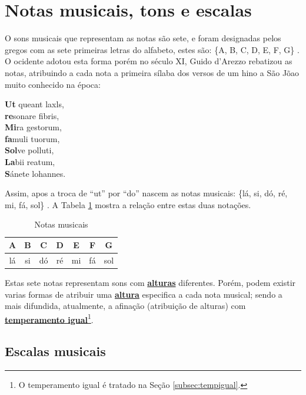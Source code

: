 \section{Notas musicais, tons e escalas}
\label{sec:notasmusicais}

O sons musicais que representam as notas são sete, 
e foram designadas pelos gregos com as sete primeiras letras do alfabeto,
estes são: \{A, B, C, D, E, F, G\} \cite[pp. 11]{grabner2001teoria} \cite[pp. 9]{cardoso1973curso}.
O ocidente adotou esta forma porém no século XI, 
Guido d'Arezzo rebatizou as notas, 
atribuindo a cada nota a primeira sílaba dos versos
de um hino a São Jõao muito conhecido na época:
\begin{citando}%
\textbf{Ut} queant laxls,\\
\textbf{re}sonare fibris,\\
\textbf{Mi}ra gestorum,\\
\textbf{fa}muli tuorum,\\
\textbf{Sol}ve polluti,\\
\textbf{La}bii reatum,\\
\textbf{S}ánete lohannes.
\end{citando}
 Assim, apos a troca de ``ut'' por ``do'' nascem as notas musicais: 
\{lá, si, dó, ré, mi, fá, sol\} \cite[pp. 21]{arbones2012armonia} \cite[pp. 7]{cardoso1973curso}. 
A Tabela \ref{tab:notasmusic} mostra a relação entre estas duas notações.

\begin{table}[h]
\centering
\begin{tabular}{|c|c|c|c|c|c|c|}
\hline
A  & B  & C  & D  & E  & F  & G\\ \hline
lá & si & dó & ré & mi & fá & sol \\ \hline
\end{tabular}
\caption{Notas musicais}
\label{tab:notasmusic}
\end{table}

Estas sete notas representam sons com \hyperref[sec:pos:Altura]{\textbf{alturas}} diferentes.
Porém, podem existir varias formas de atribuir uma \hyperref[sec:pos:Altura]{\textbf{altura}} 
especifica a cada nota musical; 
sendo a mais difundida, atualmente, a afinação (atribuição de alturas) com \hyperref[subsec:tempigual]{\textbf{temperamento igual}}\footnote{O temperamento igual é tratado na Seção \ref{subsec:tempigual}.}.


\subsection{Escalas musicais}

